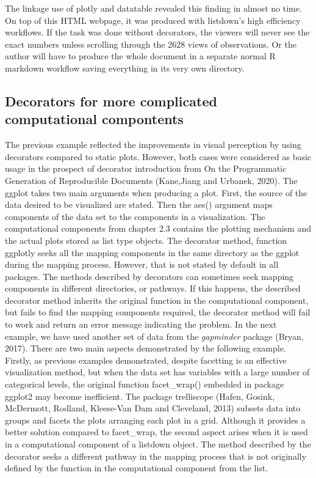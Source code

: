\documentclass[
]{article}
\begin{document}
The linkage use of plotly and datatable revealed this finding in almost
no time. On top of this HTML webpage, it was produced with listdown's
high efficiency workflows. If the task was done without decorators, the
viewers will never see the exact numbers unless scrolling through the
2628 views of observations. Or the author will have to produce the whole
document in a separate normal R markdown workflow saving everything in
its very own directory.

\hypertarget{decorators-for-more-complicated-computational-compontents}{%
\subsection{Decorators for more complicated computational
compontents}\label{decorators-for-more-complicated-computational-compontents}}

The previous example reflected the improvements in visual perception by
using decorators compared to static plots. However, both cases were
considered as basic usage in the prospect of decorator introduction from
On the Programmatic Generation of Reproducible Documents (Kane,Jiang and
Urbanek, 2020). The ggplot takes two main arguments when producing a
plot. First, the source of the data desired to be visualized are stated.
Then the aes() argument maps components of the data set to the
components in a visualization. The computational components from chapter
2.3 contains the plotting mechanism and the actual plots stored as list
type objects. The decorator method, function ggplotly seeks all the
mapping components in the same directory as the ggplot during the
mapping process. However, that is not stated by default in all packages.
The methods described by decorators can sometimes seek mapping
components in different directories, or pathways. If this happens, the
described decorator method inherits the original function in the
computational component, but fails to find the mapping components
required, the decorator method will fail to work and return an error
message indicating the problem. In the next example, we have used
another set of data from the \emph{gapminder} package (Bryan, 2017).
There are two main aspects demonstrated by the following example.
Firstly, as previous examples demonstrated, despite facetting is an
effective visualization method, but when the data set has variables with
a large number of categorical levels, the original function
facet\_wrap() embedded in package ggplot2 may become inefficient. The
package trelliscope (Hafen, Gosink, McDermott, Rodland, Kleese-Van Dam
and Cleveland, 2013) subsets data into groups and facets the plots
arranging each plot in a grid. Although it provides a better solution
compared to facet\_wrap, the second aspect arises when it is used in a
computational component of a listdown object. The method described by
the decorator seeks a different pathway in the mapping process that is
not originally defined by the function in the computational component
from the list.
\end{document}
